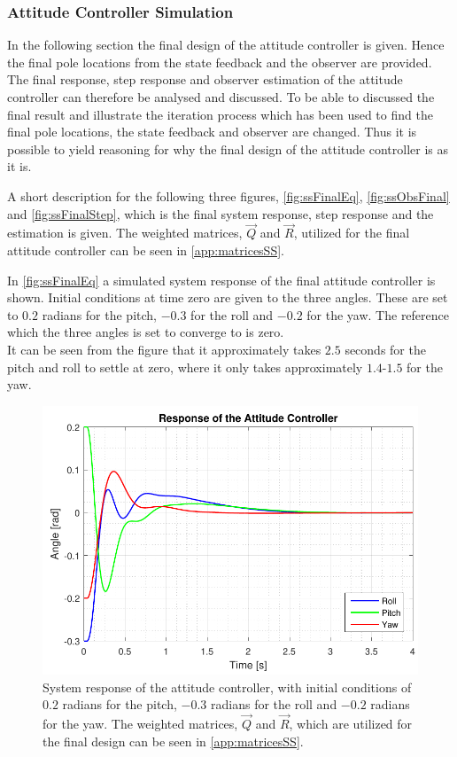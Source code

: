 \subsubsection{Attitude Controller Simulation}
In the following section the final design of the attitude controller is given. Hence the final pole locations from the state feedback and the observer are provided. The final response, step response and observer estimation of the attitude controller can therefore be analysed and discussed. To be able to discussed the final result and illustrate the iteration process which has been used to find the final pole locations, the state feedback and observer are changed. Thus it is possible to yield reasoning for why the final design of the attitude controller is as it is.

A short description for the following three figures, \autoref{fig:ssFinalEq}, \autoref{fig:ssObsFinal} and \autoref{fig:ssFinalStep}, which is the final system response, step response and the estimation is given. The weighted matrices, $\vec{Q}$ and $\vec{R}$, utilized for the final attitude controller can be seen in \autoref{app:matricesSS}.

In \autoref{fig:ssFinalEq} a simulated system response of the final attitude controller is shown. Initial conditions at time zero are given to the three angles. These are set to $0.2$ radians for the pitch, $-0.3$ for the roll and $-0.2$ for the yaw. The reference which the three angles is set to converge to is zero. \\ It can be seen from the figure that it approximately takes $2.5$ seconds for the pitch and roll to settle at zero, where it only takes approximately $1.4$-$1.5$ for the yaw.

\begin{figure}[H]
	\centering
	\includegraphics[scale=0.8]{figures/ssFinalEq.pdf}
	\caption{System response of the attitude controller, with initial conditions of $0.2$ radians for the pitch, $-0.3$ radians for the roll and $-0.2$ radians for the yaw. The weighted matrices, $\vec{Q}$ and $\vec{R}$, which are utilized for the final design can be seen in \autoref{app:matricesSS}.}
	\label{fig:ssFinalEq}
\end{figure}



